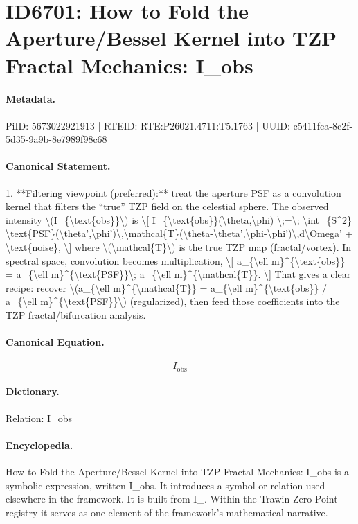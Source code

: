 \section*{ID6701: How to Fold the Aperture/Bessel Kernel into TZP Fractal Mechanics: I\_obs}
\paragraph{Metadata.}
PiID: 5673022921913 | RTEID: RTE:P26021.4711:T5.1763 | UUID: c5411fca-8c2f-5d35-9a9b-8e7989f98c68

\paragraph{Canonical Statement.}
1. **Filtering viewpoint (preferred):** treat the aperture PSF as a convolution kernel that filters the “true” TZP field on the celestial sphere. The observed intensity \textbackslash{}(I\_\{\textbackslash{}text\{obs\}\}\textbackslash{}) is \textbackslash{}[ I\_\{\textbackslash{}text\{obs\}\}(\textbackslash{}theta,\textbackslash{}phi) \textbackslash{};=\textbackslash{}; \textbackslash{}int\_\{S\textasciicircum{}2\} \textbackslash{}text\{PSF\}(\textbackslash{}theta',\textbackslash{}phi')\textbackslash{},\textbackslash{}mathcal\{T\}(\textbackslash{}theta-\textbackslash{}theta',\textbackslash{}phi-\textbackslash{}phi')\textbackslash{},d\textbackslash{}Omega' + \textbackslash{}text\{noise\}, \textbackslash{}] where \textbackslash{}(\textbackslash{}mathcal\{T\}\textbackslash{}) is the true TZP map (fractal/vortex). In spectral space, convolution becomes multiplication, \textbackslash{}[ a\_\{\textbackslash{}ell m\}\textasciicircum{}\{\textbackslash{}text\{obs\}\} = a\_\{\textbackslash{}ell m\}\textasciicircum{}\{\textbackslash{}text\{PSF\}\}\textbackslash{}; a\_\{\textbackslash{}ell m\}\textasciicircum{}\{\textbackslash{}mathcal\{T\}\}. \textbackslash{}] That gives a clear recipe: recover \textbackslash{}(a\_\{\textbackslash{}ell m\}\textasciicircum{}\{\textbackslash{}mathcal\{T\}\} = a\_\{\textbackslash{}ell m\}\textasciicircum{}\{\textbackslash{}text\{obs\}\} / a\_\{\textbackslash{}ell m\}\textasciicircum{}\{\textbackslash{}text\{PSF\}\}\textbackslash{}) (regularized), then feed those coefficients into the TZP fractal/bifurcation analysis.

\paragraph{Canonical Equation.}
\[
I_{\text{obs}}
\]

\paragraph{Dictionary.}
Relation: I\_obs

\paragraph{Encyclopedia.}
How to Fold the Aperture/Bessel Kernel into TZP Fractal Mechanics: I\_obs is a symbolic expression, written I\_obs. It introduces a symbol or relation used elsewhere in the framework. It is built from I\_. Within the Trawin Zero Point registry it serves as one element of the framework's mathematical narrative.
